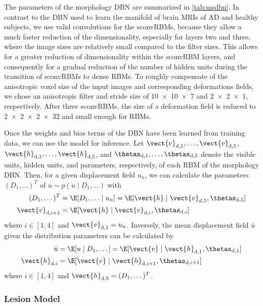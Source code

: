 The parameters of the morphology DBN are summarized in \ref{tab:msdbn}. In
contrast to the DBN used to learn the manifold of brain MRIs of AD and healthy
subjects, we use valid convolutions for the sconvRBMs, because they allow a much
faster reduction of the dimensionality, especially for layers two and three,
where the image sizes are relatively small compared to the filter sizes. This
allows for a greater reduction of dimensionality within the sconvRBM layers, and
consequently for a gradual reduction of the number of hidden units during the
transition of sconvRBMs to dense RBMs. To roughly compensate of the anisotropic
voxel size of the input images and corresponding deformations fields, we chose
an anisotropic filter and stride size of \num{10x10x7} and \num{2x2x1},
respectively. After three sconvRBMs, the size of a deformation field is reduced
to \num{2x2x2x32} and small enough for RBMs.

Once the weights and bias terms of the DBN have been learned
from training data, we can use the model for inference. Let
$\vect{v}_{\text{d},1}, \dotsc, \vect{v}_{\text{d},5}$, $\vect{h}_{\text{d},1},
\dotsc, \vect{h}_{\text{d},5}$, and $\thetas_{\text{d},1}, \dotsc,
\thetas_{\text{d},5}$ denote the visible units, hidden units, and parameters,
respectively, of each RBM of the morphology DBN. Then, for a given displacement
field $u_n$, we can calculate the parameters $(D_1, \dotsc)^T$ of $u \sim p(u
\mid D_1, \dotsc)$ with
\begin{align} 
\label{eq:inferd}
(D_1, \dotsc)^T &= \E[D_1, \dotsc \mid u_n] = \E[\vect{h} \mid
\vect{v}_{\text{d},5}, \thetas_{\text{d},5}] \\
\label{eq:inferv}
\vect{v}_{\text{d},i+1} &= \E[\vect{h} \mid \vect{v}_{\text{d},i},
\thetas_{\text{d},i}]
\end{align}
where $i \in [1,4]$ and $\vect{v}_{\text{d},1} = u_n$. Inversely, the mean
displacement field $\bar{u}$ given the distribution parameters can be calculated
by
\begin{align}
\label{eq:inferu}
\bar{u} &= \E[u \mid D_1, \dotsc] = \E[\vect{v} \mid \vect{h}_{\text{d},1},
\thetas_{\text{d},1}] \\
\label{eq:inferh}
\vect{h}_{\text{d},i} &= \E[\vect{v} \mid \vect{h}_{\text{d},i+1},
\thetas_{\text{d},i+1}]
\end{align}
where $i \in [1,4]$ and $\vect{h}_{\text{d},5} = (D_1,\dotsc)^T$.

\subsubsection{Lesion Model}

